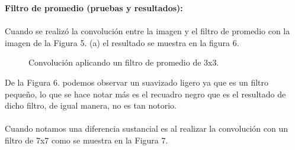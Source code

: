 \documentclass[conference]{IEEEtran}
\begin{document}
\textbf{ Filtro de promedio (pruebas y resultados):\\\\}
Cuando se realiz\'o la convoluci\'on entre la imagen y el filtro de promedio con la imagen de la Figura 5. (a) el resultado se muestra en la figura 6.

\begin{figure}[htbp]
	\centering
	\caption{Convoluci\'on aplicando un filtro de promedio de 3x3.}
\end{figure}

\newpage
De la Figura 6. podemos observar un suavizado ligero ya que es un filtro peque\~no, lo que se hace notar m\'as es el recuadro negro que es el resultado de dicho filtro, de igual manera, no es tan notorio.\\\\
Cuando notamos una diferencia sustancial es al realizar la convoluci\'on con un filtro de 7x7 como se muestra en la Figura 7.
\end{document}
